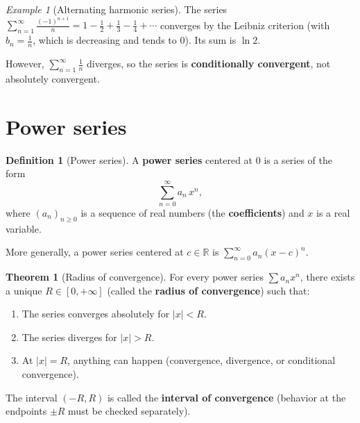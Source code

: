 \documentclass[12pt,a4paper,openany]{book}
\newcommand{\R}{\mathbb{R}}
\newcommand{\abs}[1]{\left\lvert #1 \right\rvert}
\theoremstyle{definition}
\newtheorem{definition}{Definition}[chapter]
\newtheorem{theorem}{Theorem}[chapter]
\theoremstyle{remark}
\newtheorem{example}{Example}[chapter]
\begin{document}
\begin{example}[Alternating harmonic series]\label{ex:alt-harmonic}
The series $\displaystyle\sum_{n=1}^{\infty}\frac{(-1)^{n+1}}{n}
= 1 - \frac{1}{2} + \frac{1}{3} - \frac{1}{4} + \cdots$ converges
by the Leibniz criterion (with $b_n = \frac{1}{n}$, which is decreasing
and tends to $0$). Its sum is $\ln 2$.

However, $\displaystyle\sum_{n=1}^{\infty}\frac{1}{n}$ diverges, so the
series is \textbf{conditionally convergent}, not absolutely convergent.
\end{example}

\section{Power series}\label{sec:power-series}

\begin{definition}[Power series]\label{def:power-series}
A \textbf{power series} centered at $0$ is a series of the form
\[
   \sum_{n=0}^{\infty} a_n\, x^n,
\]
where $(a_n)_{n\geq 0}$ is a sequence of real numbers (the \textbf{coefficients})
and $x$ is a real variable.

More generally, a power series centered at $c \in \R$ is
$\sum_{n=0}^{\infty} a_n (x - c)^n$.
\end{definition}

\begin{theorem}[Radius of convergence]\label{thm:radius}
For every power series $\sum a_n x^n$, there exists a unique
$R \in [0, +\infty]$ (called the \textbf{radius of convergence}) such that:
\begin{enumerate}
\item The series converges absolutely for $\abs{x} < R$.
\item The series diverges for $\abs{x} > R$.
\item At $\abs{x} = R$, anything can happen (convergence, divergence, or
      conditional convergence).
\end{enumerate}
The interval $(-R, R)$ is called the \textbf{interval of convergence}
 (behavior at the endpoints $\pm R$ must be
checked separately).
\end{theorem}
\end{document}
